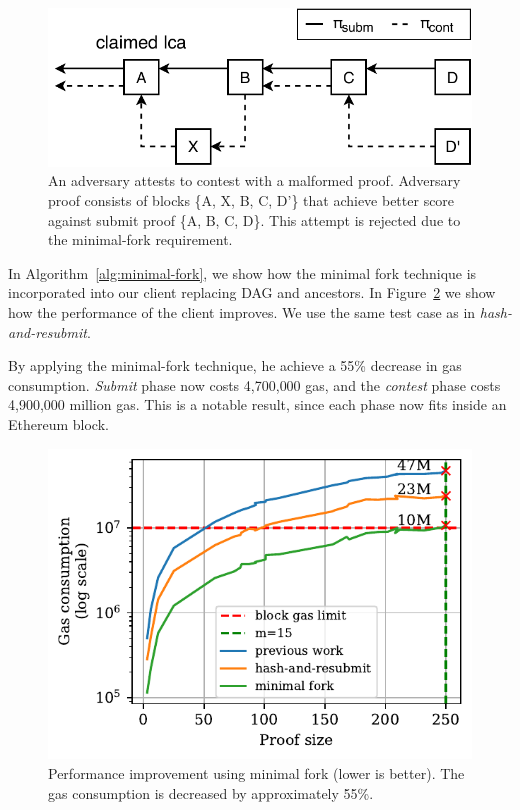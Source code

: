 \begin{figure}[h]
    \begin{center}
        \includegraphics[width=0.5\columnwidth]{figures/adversary-minimal-fork.pdf}
    \end{center}
    \caption{An adversary attests to contest with a malformed proof. Adversary
        proof consists of blocks \{A, X, B, C, D'\} that achieve better score
        against submit proof \{A, B, C, D\}. This attempt is rejected due to
        the minimal-fork requirement.}
    \label{fig:adversary-minimal-fork}
\end{figure}

In Algorithm~\ref{alg:minimal-fork}, we show how the minimal fork technique is
incorporated into our client replacing DAG and ancestors. In
Figure~\ref{fig:minimal-fork} we show how the performance of the client
improves. We use the same test case as in \emph{hash-and-resubmit}.



By applying the minimal-fork technique, he achieve a 55\% decrease in gas
consumption. \emph{Submit} phase now costs {4{,}700{,}000} gas, and
the \emph{contest} phase costs {4{,}900{,}000} million gas. This is a notable
result, since each phase now fits inside an Ethereum block.


\begin{figure}[h]
    \begin{center}
        \includegraphics[width=0.6\columnwidth]{figures/minimal-fork.pdf}
    \end{center}
    \caption{Performance improvement using minimal fork (lower is better). The
        gas consumption is decreased by approximately 55\%.}
    \label{fig:minimal-fork}
\end{figure}

